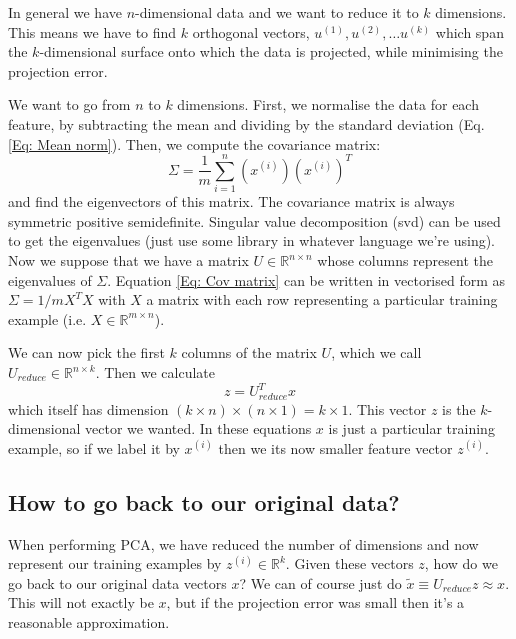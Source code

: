\documentclass[a4paper, 10pt,hidelinks]{article}
\newcommand{\R}{\mathbb{R}}
\newcommand{\ind}[1]{^{(#1)}}
\begin{document}

In general we have $n$-dimensional data and we want to reduce it to $k$ dimensions. This means we have to find $k$ orthogonal vectors, $u\ind{1}, u\ind{2}, \ldots u\ind{k}$ which span the $k$-dimensional surface onto which the data is projected, while minimising the projection error.


We want to go from $n$ to $k$ dimensions.
First, we normalise the data for each feature, by subtracting the mean and dividing by the standard deviation (Eq. \eqref{Eq: Mean norm}).  Then, we compute the covariance matrix:
\begin{equation}\label{Eq: Cov matrix}
\Sigma = \frac{1}{m} \sum_{i = 1}^n \left(x\ind{i}\right) \left(x\ind{i}\right)^T
\end{equation}
and find the eigenvectors of this matrix. The covariance matrix is always symmetric positive semidefinite. Singular value decomposition (svd) can be used to get the eigenvalues (just use some library in whatever language we're using). Now we suppose that we have a matrix $U \in \mathbb{R}^{n \times n}$ whose columns represent the eigenvalues of $\Sigma$. Equation \eqref{Eq: Cov matrix} can be written in vectorised form as $\Sigma = 1/m X^T X$ with $X$ a matrix with each row representing a particular training example (i.e. $X \in \mathbb{R}^{m \times n}$). 

We can now pick the first $k$ columns of the matrix $U$, which we call $U_{reduce} \in \mathbb{R}^{n \times k}$. Then we calculate 
\begin{equation}
z = U_{reduce}^T x
\end{equation}
which itself has dimension $(k \times n)\times (n \times 1) = k \times 1$. This vector $z$ is the $k$-dimensional vector we wanted. In these equations $x$ is just a particular training example, so if we label it by $x\ind{i}$ then we its now smaller feature vector $z\ind{i}$. 

\subsection{How to go back to our original data?}
When performing PCA, we have reduced the number of dimensions and now represent our training examples by $z\ind{i} \in \R^k$. Given these vectors $z$, how do we go back to our original data vectors $x$? We can of course just do $\tilde{x} \equiv U_{reduce} z \approx x$. This will not exactly be $x$, but if the projection error was small then it's a reasonable approximation. 
\end{document}
